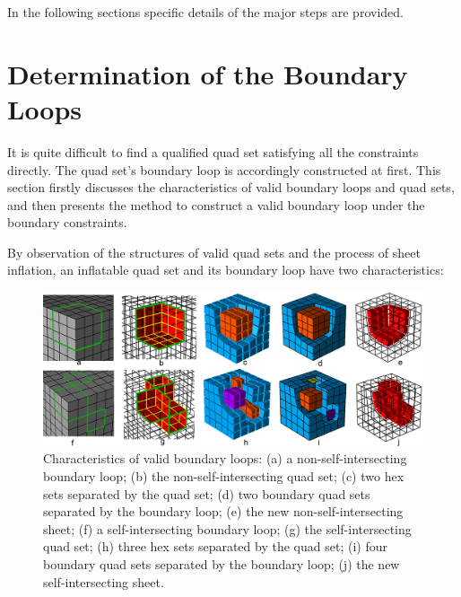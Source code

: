 \documentclass[final,5p,times,twocolumn]{elsarticle}
\begin{document}
In the following sections specific details of the major steps are provided.

\section{Determination of the Boundary Loops}
\label{sec:det_bound_loops}
It is quite difficult to find a qualified quad set satisfying all the constraints directly. The quad set's boundary loop is accordingly constructed at first. This section firstly discusses the characteristics of valid boundary loops and quad sets, and then presents the method to construct a valid boundary loop under the boundary constraints.

By observation of the structures of valid quad sets and the process of sheet inflation, an inflatable quad set and its boundary loop have two characteristics:

\begin{figure}[htbp]
\begin{center}
\includegraphics[width=15cm]{figures/compo_loop_prop.png}
\caption{Characteristics of valid boundary loops: (a) a non-self-intersecting boundary loop; (b) the non-self-intersecting quad set; (c) two hex sets separated by the quad set; (d) two boundary quad sets separated by the boundary loop; (e) the new non-self-intersecting sheet; (f) a self-intersecting boundary loop; (g) the self-intersecting quad set; (h) three hex sets separated by the quad set; (i) four boundary quad sets separated by the boundary loop; (j) the new self-intersecting sheet.}
\label{fig:loop_prop}
\end{center}
\end{figure}
\end{document}
